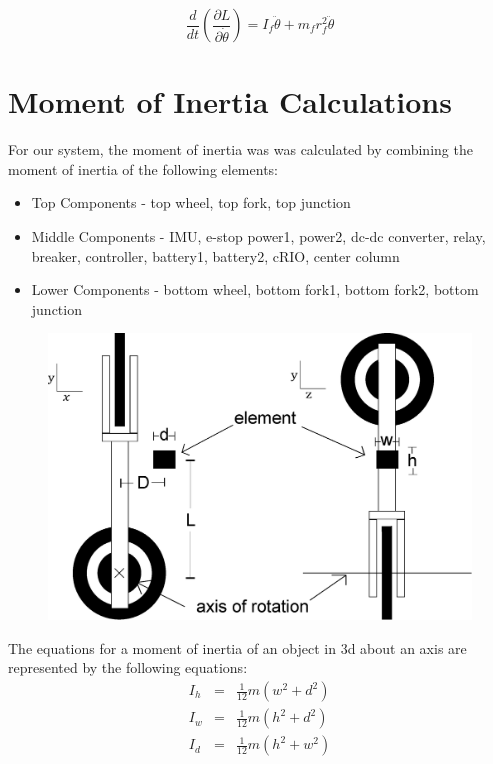 \documentclass{article}
\begin{document}
\begin{equation}
\frac{d}{dt} \left(\frac{\partial{L}}{\partial{\dot{\theta}}}\right) = I_{f} \ddot{\theta} + m_{f} r_{f}^2 \ddot{\theta}
\end{equation}


\newpage
\section{Moment of Inertia Calculations}
For our system, the moment of inertia was was calculated by combining the moment of inertia of the following elements:
\begin{itemize}
\item Top Components - top wheel, top fork, top junction
\item Middle Components - IMU, e-stop power1, power2, dc-dc converter, relay, breaker, controller, battery1, battery2, cRIO, center column
\item Lower Components - bottom wheel, bottom fork1, bottom fork2, bottom junction \\
\end{itemize} 

\begin{figure}[h]
\centering
\includegraphics[scale=0.4]{momentOfInertiaDiagram}\\
\end{figure}

The equations for a moment of inertia of an object in 3d about an axis are represented by the following equations:
\begin{eqnarray}
I_{h} &=& \frac{1}{12} m(w^2 + d^2) \nonumber \\
I_{w} &=& \frac{1}{12} m(h^2 + d^2) \nonumber \\
I_{d} &=& \frac{1}{12} m(h^2 + w^2) \nonumber \\
\end{eqnarray}
\end{document}
